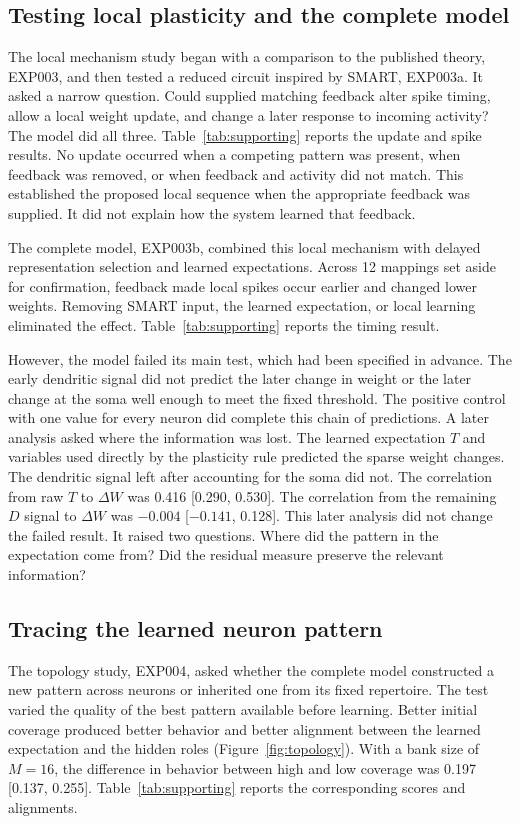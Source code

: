 \documentclass[11pt]{article}
\begin{document}
\subsection{Testing local plasticity and the complete model}
The local mechanism study began with a comparison to the published theory, EXP003, and then tested a reduced circuit inspired by SMART, EXP003a. It asked a narrow question. Could supplied matching feedback alter spike timing, allow a local weight update, and change a later response to incoming activity? The model did all three. Table~\ref{tab:supporting} reports the update and spike results. No update occurred when a competing pattern was present, when feedback was removed, or when feedback and activity did not match. This established the proposed local sequence when the appropriate feedback was supplied. It did not explain how the system learned that feedback.

The complete model, EXP003b, combined this local mechanism with delayed representation selection and learned expectations. Across 12 mappings set aside for confirmation, feedback made local spikes occur earlier and changed lower weights. Removing SMART input, the learned expectation, or local learning eliminated the effect. Table~\ref{tab:supporting} reports the timing result.

However, the model failed its main test, which had been specified in advance. The early dendritic signal did not predict the later change in weight or the later change at the soma well enough to meet the fixed threshold. The positive control with one value for every neuron did complete this chain of predictions. A later analysis asked where the information was lost. The learned expectation $T$ and variables used directly by the plasticity rule predicted the sparse weight changes. The dendritic signal left after accounting for the soma did not. The correlation from raw $T$ to $\Delta W$ was 0.416 [0.290, 0.530]. The correlation from the remaining $D$ signal to $\Delta W$ was $-0.004$ [$-0.141$, 0.128]. This later analysis did not change the failed result. It raised two questions. Where did the pattern in the expectation come from? Did the residual measure preserve the relevant information?

\subsection{Tracing the learned neuron pattern}
The topology study, EXP004, asked whether the complete model constructed a new pattern across neurons or inherited one from its fixed repertoire. The test varied the quality of the best pattern available before learning. Better initial coverage produced better behavior and better alignment between the learned expectation and the hidden roles (Figure~\ref{fig:topology}). With a bank size of $M=16$, the difference in behavior between high and low coverage was 0.197 [0.137, 0.255]. Table~\ref{tab:supporting} reports the corresponding scores and alignments.
\end{document}
